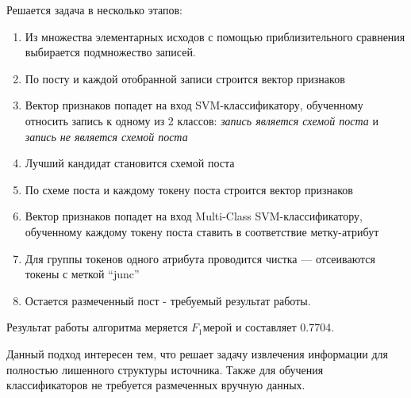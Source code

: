 Решается задача в несколько этапов: 
\begin{enumerate}
	\item Из множества элементарных исходов с помощью приблизительного сравнения выбирается подмножество записей.
	\item По посту и каждой отобранной записи строится вектор признаков
	\item Вектор признаков попадет на вход SVM-классификатору, обученному относить запись к одному из 2 классов: \textit{запись является схемой поста} и \textit{запись не является схемой поста}
	\item Лучший кандидат становится схемой поста
	\item По схеме поста и каждому токену поста строится вектор признаков
	\item Вектор признаков попадет на вход Multi-Class SVM-классификатору, обученному каждому токену поста ставить в соответствие метку-атрибут
	\item Для группы токенов одного атрибута проводится чистка --- отсеиваются токены с меткой ``junc''
	\item Остается размеченный пост - требуемый результат работы.
\end{enumerate}

Результат работы алгоритма меряется $F_1 \text{мерой}$ и составляет 0.7704.

Данный подход интересен тем, что решает задачу извлечения информации для полностью лишенного структуры источника. Также для обучения классификаторов не требуется размеченных вручную данных.